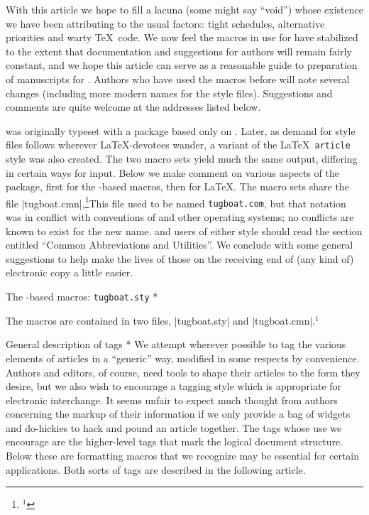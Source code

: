 With this article we hope to fill a lacuna (some might say ``void'')
whose existence we have been attributing to the usual factors: tight
schedules, alternative priorities and warty \TeX\ code.  We now feel
the macros in use for \TUB\/ have stabilized to the extent that
documentation and suggestions for authors will remain fairly constant,
and we hope this article can serve as a reasonable guide to
preparation of manuscripts for \TUB.  Authors who have used the \TUB\/
macros before will note several changes (including more modern names
for the style files).  Suggestions and comments are quite welcome at
the addresses listed below.

\TUB\/ was originally typeset with a package based only on \plain.
Later, as demand for style files follows wherever
\LaTeX-devotees wander, a \TUB\/ variant of the \LaTeX\ {\tt article}
style was also created.  The two macro sets yield
much the same output, differing in certain ways for input.  Below we
make comment on various aspects of the \TUB\/ package, first for the
\plain-based macros, then for \LaTeX.  The macro sets share
the file |tugboat.cmn|,\footnote{$^1$}{This file used to be named
{\tt tugboat.com}, but that notation was in conflict with conventions
of  and other operating systems; no conflicts are known to
exist for the new name.} and users of either style should read the
section entitled ``Common Abbreviations and Utilities''.  We conclude
with some general suggestions to help make the lives of those on the
receiving end of (any kind of) electronic copy a little easier.


\head * The \plain-based macros: {\tt tugboat.sty} *

The macros are contained in two files, |tugboat.sty| and |tugboat.cmn|.$^1$

\subhead * General description of tags *
We attempt wherever possible to tag the various elements of \TUB\/
articles in a ``generic'' way, modified in some respects by
convenience.  Authors and editors, of course, need tools to shape
their articles to the form they desire, but we also wish to encourage
a tagging style which is appropriate for electronic interchange.  It
seems unfair to expect much thought from authors concerning the
markup of their information if we only provide a bag of widgets and
do-hickies to hack and pound an article together.  The tags whose use
we encourage are the higher-level tags that mark the logical
document structure.  Below these are formatting macros that we
recognize may be essential for certain applications.  Both sorts of
tags are described in the following article.

